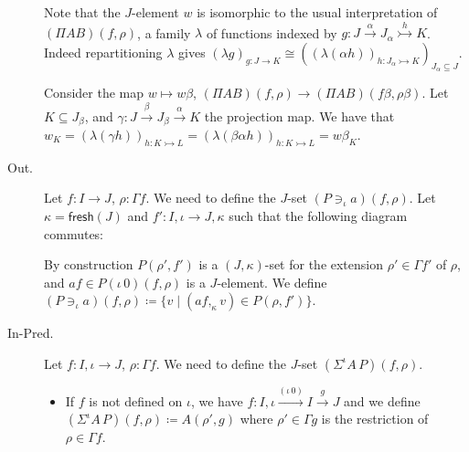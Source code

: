 \documentclass[english]{PaperTools/latex/lipics}
\newcommand\op[1]{∋_{#1}}
\newcommand\ip[3]{Σ^{#1} {#2}\,{#3}}
\def\fresh#1{\mathsf{fresh}(#1)}
\def\ie{\textit{i.e.}}
\begin{document}
\begin{description}
    Note that the $J$-element $w$ is isomorphic to the usual interpretation
    of $(ΠAB)(f,ρ)$, a family $λ$ of functions indexed by
    $g : J \stackrel{α}{→} J_α \stackrel {h}{↣} K$.  Indeed repartitioning $λ$ gives
    $\left(λg\right)_{g : J → K} ≅ \left(\left(λ(αh)\right)_{h : J_α ↣ K}\right)_{J_α ⊆ J}$.

    Consider the map $w ↦ wβ$, $(Π A B)(f,ρ) → (Π A B)(fβ,ρβ)$.  Let
    $K ⊆ J_β$, and $γ : J \stackrel{β}{→} J_β \stackrel{α}{→} K$ the projection map.
    We have that
    $w_K = \left(λ(γh)\right)_{h : K ↣ L}
         = \left(λ(βαh)\right)_{h : K ↣ L}
         = wβ_K$.


  \item[\sc Out.]
    Let $f : I → J$, $ρ : Γf$.  We need to define the $J$-set $(P \op {ι} a)(f,ρ)$.
    Let $κ = \fresh J$ and $f' : I,ι → J,κ$ such that the following
    diagram commutes:


    By construction $P(ρ',f')$ is a $(J,κ)$-set for the extension $ρ' ∈ Γf'$ of $ρ$,
    and $af ∈ P(ι\,0)(f,ρ)$ is a $J$-element.
    We define $(P \op {ι} a)(f,ρ) ≔ \{ v \mid (af ,_κ v) ∈ P(ρ,f')\}$.

  \item[\sc In-Pred.]
    Let $f : I,ι → J$, $ρ : Γf$.  We need to define the $J$-set $(\ip {ι} A P)(f,ρ)$.

    \begin{itemize}
      \item If $f$ is not defined on $ι$, we have $f : I,ι \stackrel{(ι\,0)}{→} I \stackrel{g}{→} J$
        and we define $(\ip {ι} A P)(f,ρ) ≔ A(ρ',g)$
        where $ρ' ∈ Γg$ is the restriction of $ρ ∈ Γf$.


\end{itemize}
\end{description}
\end{document}
